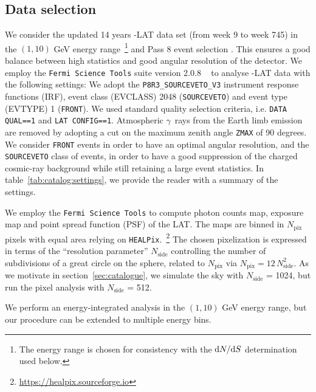 \subsection{Data selection}
\label{sec:catalog:data}
We consider the updated 14 years \Fermi-LAT data set (from week 9 to week 745) in the $(1,10)$ GeV energy range~\footnote{The energy range is chosen for consistency with the $\textrm{d}N/\textrm{d}S$ determination used below.} and Pass 8 event selection \cite{Fermi-LAT:2013jgq,Bruel:2018lac}. This ensures a good balance between high statistics and good angular resolution of the detector. We employ the \texttt{Fermi Science Tools} suite version 2.0.8 ~\cite{Fermitools} to analyse \Fermi-LAT data with the following settings: 
We adopt the \verb|P8R3_SOURCEVETO_V3| instrument response functions (IRF), event class (EVCLASS) 2048 (\texttt{SOURCEVETO}) and event type (EVTYPE) 1 (\verb|FRONT|). We used standard quality selection criteria, i.e. \verb|DATA QUAL==1| and \verb|LAT CONFIG==1|.
Atmospheric $\gamma$~rays from the Earth limb emission are removed by adopting a cut on the maximum zenith angle \texttt{ZMAX} of 90 degrees. We consider \verb|FRONT| events in order to have an optimal angular resolution, and the \texttt{SOURCEVETO} class of events, in order to have a good suppression of the charged cosmic-ray background while still retaining a large event statistics. 
In table~\ref{tab:catalog:settings}, we provide the reader with  a summary of the settings.
%

We employ the \texttt{Fermi Science Tools} to compute photon counts map, exposure map and point spread function (PSF) of the LAT.
%
The maps are binned in $N_\textrm{pix}$ pixels with equal area  relying on \texttt{HEALPix}.~\footnote{\href{https://healpix.sourceforge.io}{https://healpix.sourceforge.io}} The chosen pixelization is expressed in terms of the ``resolution parameter'' $N_\textrm{side}$ controlling the number of subdivisions of a great circle on the sphere, related to $N_\textrm{pix}$ via $N_\textrm{pix}=12 \, N_\textrm{side}^2$. 
%
As we  motivate in section~\ref{sec:catalogue}, we simulate the sky
with $N_\textrm{side}$ = 1024, but run the pixel analysis with $N_\textrm{side}$ = 512. 
%

We perform an energy-integrated analysis in the $(1,10)$ GeV energy range, but our procedure can be  extended to multiple energy bins.

